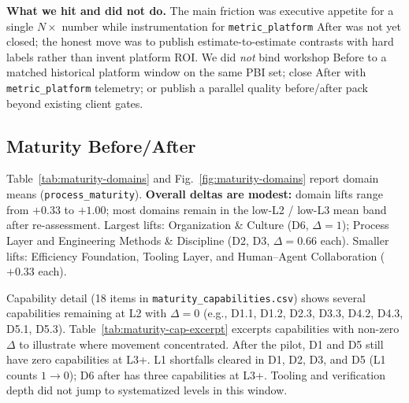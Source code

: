 \documentclass[10pt,conference]{IEEEtran}
\begin{document}
\textbf{What we hit and did not do.}
The main friction was executive appetite for a single $N\times$ number while instrumentation for \texttt{metric\_platform} After was not yet closed; the honest move was to publish estimate-to-estimate contrasts with hard labels rather than invent platform ROI.
We did \emph{not} bind workshop Before to a matched historical platform window on the same PBI set; close After with \texttt{metric\_platform} telemetry; or publish a parallel quality before/after pack beyond existing client gates.

\subsection{Maturity Before/After}
\label{sec:case-maturity}

Table~\ref{tab:maturity-domains} and Fig.~\ref{fig:maturity-domains} report domain means (\texttt{process\_maturity}).
\textbf{Overall deltas are modest:} domain lifts range from $+0.33$ to $+1.00$; most domains remain in the low-L2 / low-L3 mean band after re-assessment.
Largest lifts: Organization \& Culture (D6, $\Delta=1$); Process Layer and Engineering Methods \& Discipline (D2, D3, $\Delta=0.66$ each).
Smaller lifts: Efficiency Foundation, Tooling Layer, and Human--Agent Collaboration ($+0.33$ each).

Capability detail (18 items in \texttt{maturity\_capabilities.csv}) shows several capabilities remaining at L2 with $\Delta=0$ (e.g., D1.1, D1.2, D2.3, D3.3, D4.2, D4.3, D5.1, D5.3).
Table~\ref{tab:maturity-cap-excerpt} excerpts capabilities with non-zero $\Delta$ to illustrate where movement concentrated.
After the pilot, D1 and D5 still have zero capabilities at L3+.
L1 shortfalls cleared in D1, D2, D3, and D5 (L1 counts $1\rightarrow0$); D6 after has three capabilities at L3+.
Tooling and verification depth did not jump to systematized levels in this window.
\end{document}
